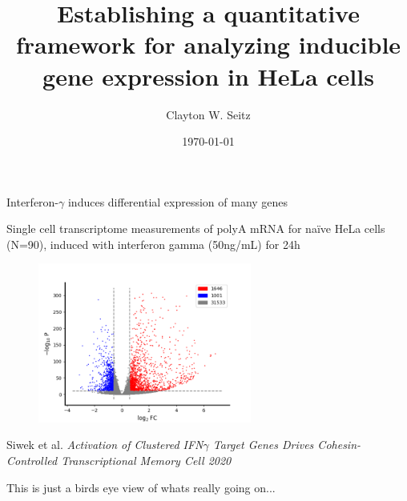 \documentclass[aspectratio=1610]{beamer}					%
\title{Establishing a quantitative framework for analyzing inducible gene expression in HeLa cells}	%
\author{Clayton W. Seitz}								%
\date{\today}									%
\begin{document}
\begin{frame}
  \titlepage
\end{frame}


%


\begin{frame}{Interferon-$\gamma$ induces differential expression of many genes}

\vspace{0.1in}
Single cell transcriptome measurements of polyA mRNA for naïve HeLa cells (N=90), induced with interferon gamma (50ng/mL) for 24h

\begin{figure}
\includegraphics[width=7cm]{volcano.png}
\end{figure}

{\tiny Siwek et al. 
\it{Activation of Clustered IFN$\gamma$ Target Genes Drives Cohesin-Controlled Transcriptional Memory} Cell 2020}

This is just a birds eye view of whats really going on...

\end{frame}

\begin{frame}

\end{frame}
\end{document}
